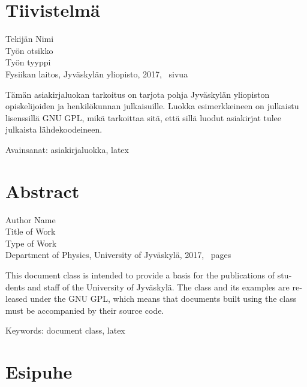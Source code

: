 \documentclass[final, finnished, monochromatic]{jyuthesis}
\newcommand \jyuauthor{Author Name}
\newcommand \jyuauthorfinnish{Tekijän Nimi}
\newcommand \jyutitle{Title of Work}
\newcommand \jyutitlefinnish{Työn otsikko}
\newcommand \jyupublication{Type of Work}
\newcommand \jyupublicationfinnish{Työn tyyppi}
\newcommand \jyuinstitute{University of Jyväskylä}
\newcommand \jyuinstitutefinnish{Jyväskylän yliopisto}
\newcommand \jyudepartment{Department of Physics}
\newcommand \jyudepartmentfinnish{Fysiikan laitos}
\newcommand \jyuyear{2017}
\begin{document}
\maketitle

\section*{Tiivistelmä}

\noindent
\jyuauthorfinnish \\
\jyutitlefinnish \\
\jyupublicationfinnish \\
\jyudepartmentfinnish, \jyuinstitutefinnish, \jyuyear,
\pageref{p/lastpage}~sivua

\bigskip

\noindent
Tämän asiakirjaluokan tarkoitus on tarjota pohja
Jyväskylän yliopiston opiskelijoiden ja henkilökunnan julkaisuille.
Luokka esimerkkeineen on julkaistu lisenssillä GNU GPL, mikä tarkoittaa sitä,
että sillä luodut asiakirjat tulee julkaista lähdekoodeineen.

\bigskip

\noindent Avainsanat: asiakirjaluokka, latex

\section*{Abstract}

\noindent
\jyuauthor \\
\jyutitle \\
\jyupublication \\
\jyudepartment, \jyuinstitute, \jyuyear,
\pageref{p/lastpage}~pages

\bigskip

\begin{otherlanguage}{english}
  \noindent
  This document class is intended to provide a basis
  for the publications of students and staff of the University of Jyväskylä.
  The class and its examples are released under the GNU GPL, which means that
  documents built using the class must be accompanied by their source code.
\end{otherlanguage}

\bigskip

\noindent Keywords: document class, latex

\section*{Esipuhe}
\end{document}
